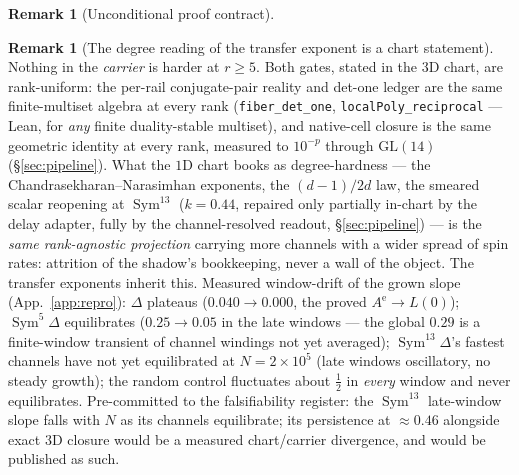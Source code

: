 \documentclass[11pt]{article}
\theoremstyle{definition}
\newtheorem{remark}[theorem]{Remark}
\newcommand{\Sym}{\operatorname{Sym}}
\begin{document}
\begin{remark}[Unconditional proof contract]
\begin{enumerate}
\begin{remark}[The degree reading of the transfer exponent is a chart statement]\label{rem:chartdegree}
Nothing in the \emph{carrier} is harder at $r\ge5$. Both gates, stated in the $3$D chart, are rank-uniform:
the per-rail conjugate-pair reality and det-one ledger are the same finite-multiset algebra at every rank
(\texttt{fiber\_det\_one}, \texttt{localPoly\_reciprocal} --- Lean, for \emph{any} finite duality-stable
multiset), and native-cell closure is the same geometric identity at every rank, measured to $10^{-p}$
through $\mathrm{GL}(14)$ (\S\ref{sec:pipeline}). What the $1$D chart books as degree-hardness --- the
Chandrasekharan--Narasimhan exponents, the $(d-1)/2d$ law, the smeared scalar reopening at $\Sym^{13}$
($k=0.44$, repaired only partially in-chart by the delay adapter, fully by the channel-resolved readout,
\S\ref{sec:pipeline}) --- is the \emph{same rank-agnostic projection} carrying more channels with a wider
spread of spin rates: attrition of the shadow's bookkeeping, never a wall of the object. The transfer
exponents inherit this. Measured window-drift of the grown slope (App.~\ref{app:repro}): $\Delta$ plateaus
($0.040\to0.000$, the proved $A^{\mathrm e}\to L(0)$); $\Sym^5\Delta$ equilibrates ($0.25\to0.05$ in the
late windows --- the global $0.29$ is a finite-window transient of channel windings not yet averaged);
$\Sym^{13}\Delta$'s fastest channels have not yet equilibrated at $N=2\times10^{5}$ (late windows
oscillatory, no steady growth); the random control fluctuates about $\tfrac12$ in \emph{every} window and
never equilibrates. Pre-committed to the falsifiability register: the $\Sym^{13}$ late-window slope falls
with $N$ as its channels equilibrate; its persistence at ${\approx}0.46$ alongside exact $3$D closure would
be a measured chart/carrier divergence, and would be published as such.
\end{remark}


\end{enumerate}
\end{remark}
\end{document}
